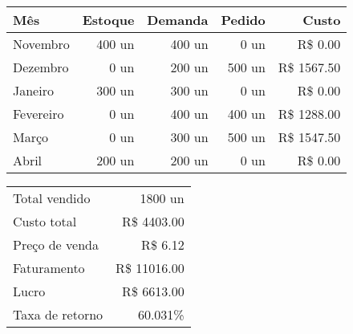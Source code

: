 
	\begin{table}[ht]
		\centering
		\begin{tabular}{lrrrr}
			\toprule
			Mês       & Estoque & Demanda & Pedido &       Custo \\
			\midrule
			Novembro  &  400 un &  400 un &   0 un & R\$    0.00 \\
			Dezembro  &    0 un &  200 un & 500 un & R\$ 1567.50 \\
			Janeiro   &  300 un &  300 un &   0 un & R\$    0.00 \\
			Fevereiro &    0 un &  400 un & 400 un & R\$ 1288.00 \\
			Março     &    0 un &  300 un & 500 un & R\$ 1547.50 \\
			Abril     &  200 un &  200 un &   0 un & R\$    0.00 \\
			\bottomrule
		\end{tabular}
	\end{table}

	\begin{table}[ht]
		\centering
		\begin{tabular}{lr}
			\toprule
			Total vendido   &      1800 un    \\
			Custo total     & R\$  4403.00    \\
			Preço de venda  & R\$     6.12    \\
			Faturamento     & R\$ 11016.00    \\
			Lucro           & R\$  6613.00    \\
			Taxa de retorno &        60.031\% \\
			\bottomrule
		\end{tabular}
	\end{table}

